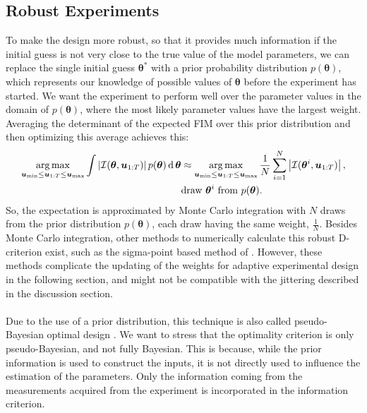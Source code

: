 \subsection{Robust Experiments}
To make the design more robust, so that it provides much information if the initial guess is not very close to the true value of the model parameters, we can replace the single initial guess $\bm \theta^*$ with a prior probability distribution $p(\bm \theta)$, which represents our {\color{red}knowledge of} possible values of $\bm \theta$ before the experiment has started. We want the experiment to perform well over the parameter values in the domain of $p(\bm \theta)$, where the most likely parameter values have the largest weight. Averaging the determinant of the expected FIM over this prior distribution and then optimizing this average achieves this:
\begin{equation}
\begin{aligned}
\operatorname*{arg\,max}_{\bm u_\text{min} \leq \bm u_{1:T} \leq \bm u_\text{max}} \int \left | \mathcal{I}(\bm \theta,\bm u_{1:T}) \right | p(\bm \theta) \operatorname{\mathrm{d}} \bm \theta
&\approx \operatorname*{arg\,max}_{\bm u_\text{min} \leq \bm u_{1:T} \leq \bm u_\text{max}} \frac{1}{N} \sum_{i=1}^N
\left | \mathcal{I}(\bm \theta^i,\bm u_{1:T}) \right |,\\
&\text{draw } \bm \theta^i \text{ from } p(\bm \theta).
\label{bayesian optimality}
\end{aligned}
\end{equation}
So, the expectation is approximated by Monte Carlo integration with $N$ draws from the prior distribution $p(\bm \theta)$, each draw having the same weight, $\frac{1}{N}$.
{\color{red}Besides Monte Carlo integration, other methods to numerically calculate this robust D-criterion exist, such as the sigma-point based method of \textcite{telen}. However, these methods complicate the updating of the weights for adaptive experimental design in the following section, and might not be compatible with the jittering described in the discussion section.}
\\
\\
Due to the use of a prior distribution, this technique is also called pseudo-Bayesian optimal design \parencite{chaloner}. We want to stress that the optimality criterion is only pseudo-Bayesian, and not fully Bayesian. This is because, while the prior information is used to construct the inputs, it is not directly used to influence the estimation of the parameters. Only the information coming from the measurements acquired from the experiment is incorporated in the information criterion.
